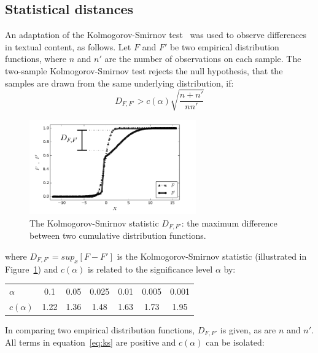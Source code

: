 \documentclass[review]{elsarticle}
\begin{document}
\subsection{Statistical distances}\label{sstat}
An adaptation of the Kolmogorov-Smirnov test~\cite{kolm} was used to observe differences in textual content, as follows.
Let $F$ and $F'$ be two empirical distribution functions, where $n$ and $n'$ are the number of observations on each sample.
The two-sample Kolmogorov-Smirnov test rejects the null hypothesis, that the samples are drawn from the same underlying distribution, if:
\begin{equation}\label{eq:ks}
D_{F,F'} > c(\alpha)\sqrt{\frac{n+n'}{nn'}}
\end{equation}

\begin{figure}[!htbp] %
\vspace{-2pt}
\begin{center}
	\includegraphics[width=0.64\textwidth]{./figs/Dnn}
	\caption{The Kolmogorov-Smirnov statistic $D_{F,F'}$: the maximum difference between
		two cumulative distribution functions.}
	\label{fig:dnn}
\end{center}
\end{figure}


\noindent where $D_{F,F'}=sup_x[F - F']$ is the Kolmogorov-Smirnov statistic
(illustrated in Figure~\ref{fig:dnn})
and $c(\alpha)$ is related to the significance level $\alpha$ by:

\begin{table}[H]
\centering
\begin{tabular}{l|c c c c c c}
$\alpha$ & 0.1 & 0.05 & 0.025 & 0.01 & 0.005 & 0.001 \\
$c(\alpha)$ & 1.22 & 1.36 & 1.48 & 1.63 & 1.73 & 1.95 \\
\end{tabular}
\end{table}

In comparing two empirical distribution functions,
$D_{F,F'}$ is given, as are $n$ and $n'$.
All terms in equation~\ref{eq:ks} are positive and $c(\alpha)$ can be isolated:
\end{document}
